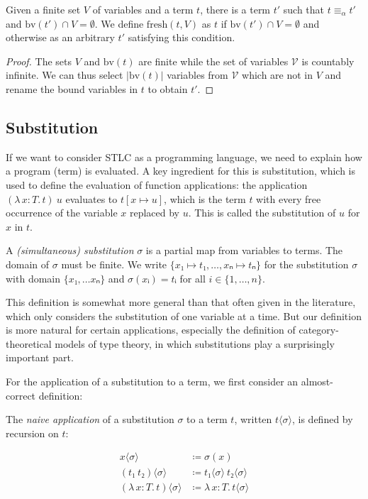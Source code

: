 \documentclass{article}
\theoremstyle{definition}
\newcommand{\Vars}{\mathcal{V}}
\newcommand{\bv}{\mathrm{bv}}
\newcommand{\fresh}{\mathrm{fresh}}
\newcommand{\Lam}[2]{λ\,#1.\, #2}
\begin{document}
\begin{lemma}\label{lem:fresh-terms}
  Given a finite set $V$ of variables and a term $t$, there is a term $t'$ such that $t ≡_{α} t'$ and $\bv(t') ∩ V = ∅$.
  We define $\fresh(t, V)$ as $t$ if $\bv(t') ∩ V = ∅$ and otherwise as an arbitrary $t'$ satisfying this condition.
\end{lemma}

\begin{proof}
  The sets $V$ and $\bv(t)$ are finite while the set of variables $\Vars$ is countably infinite.
  We can thus select $|\bv(t)|$ variables from $\Vars$ which are not in $V$ and rename the bound variables in $t$ to obtain $t'$.
\end{proof}

\subsection{Substitution}

If we want to consider STLC as a programming language, we need to explain how a program (term) is evaluated.
A key ingredient for this is substitution, which is used to define the evaluation of function applications:
the application $(\Lam{x : T}{t})~u$ evaluates to $t[x ↦ u]$, which is the term $t$ with every free occurrence of the variable $x$ replaced by $u$.
This is called the substitution of $u$ for $x$ in $t$.

\begin{definition}[Substitution]
  A \emph{(simultaneous) substitution} $σ$ is a partial map from variables to terms.
  The domain of $σ$ must be finite.
  We write $\{x₁ ↦ t₁, \dots, xₙ ↦ tₙ\}$ for the substitution $σ$ with domain $\{x₁, \dots xₙ\}$ and $σ(xᵢ) = tᵢ$ for all $i ∈ \{1, \dots, n\}$.
\end{definition}

This definition is somewhat more general than that often given in the literature, which only considers the substitution of one variable at a time.
But our definition is more natural for certain applications, especially the definition of category-theoretical models of type theory, in which substitutions play a surprisingly important part.

For the application of a substitution to a term, we first consider an almost-correct definition:

\begin{definition}
  The \emph{naive application} of a substitution $σ$ to a term $t$, written $t⟨σ⟩$, is defined by recursion on $t$:

  \begin{align*}
    x⟨σ⟩ &\coloneqq σ(x) \\
    (t₁~t₂)⟨σ⟩ &≔ t₁⟨σ⟩~t₂⟨σ⟩ \\
    (\Lam{x : T}{t})⟨σ⟩ &≔ \Lam{x : T}{t⟨σ⟩}
  \end{align*}
\end{definition}
\end{document}
